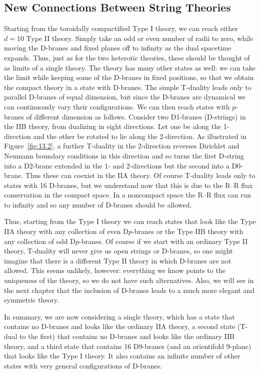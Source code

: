\subsection*{New Connections Between String Theories}

Starting from the toroidally compactified Type I theory, we can reach either $d = 10$ Type II theory. Simply take an odd or even number of radii to zero, while moving the D-branes and fixed planes off to infinity as the dual spacetime expands. Thus, just as for the two heterotic theories, these should be thought of as limits of a single theory. The theory has many other states as well: we can take the limit while keeping some of the D-branes in fixed positions, so that we obtain the compact theory in a state with D-branes. The simple T-duality leads only to parallel D-branes of equal dimension, but since the D-branes are dynamical we can continuously vary their configurations. We can then reach states with $p$-branes of different dimension as follows. Consider two D1-branes (D-strings) in the IIB theory, from dualizing in eight directions. Let one be along the 1-direction and the other be rotated to lie along the 2-direction. As illustrated in Figure~\ref{fig:13.2}, a further T-duality in the 2-direction reverses Dirichlet and Neumann boundary conditions in this direction and so turns the first D-string into a D2-brane extended in the 1- and 2-directions but the second into a D0-brane. Thus these can coexist in the IIA theory. Of course T-duality leads only to states with 16 D-branes, but we understand now that this is due to the R--R flux conservation in the compact space. In a noncompact space the R--R flux can run to infinity and so any number of D-branes should be allowed.

Thus, starting from the Type I theory we can reach states that look like the Type IIA theory with any collection of even D$p$-branes or the Type IIB theory with any collection of odd D$p$-branes. Of course if we start with an ordinary Type II theory, T-duality will never give us open strings or D-branes, so one might imagine that there is a different Type II theory in which D-branes are not allowed. This seems unlikely, however: everything we know points to the uniqueness of the theory, so we do not have such alternatives. Also, we will see in the next chapter that the inclusion of D-branes leads to a much more elegant and symmetric theory.

In summary, we are now considering a single theory, which has a state that contains no D-branes and looks like the ordinary IIA theory, a second state (T-dual to the first) that contains no D-branes and looks like the ordinary IIB theory, and a third state that contains 16 D9-branes (and an orientifold 9-plane) that looks like the Type I theory. It also contains an infinite number of other states with very general configurations of D-branes.

